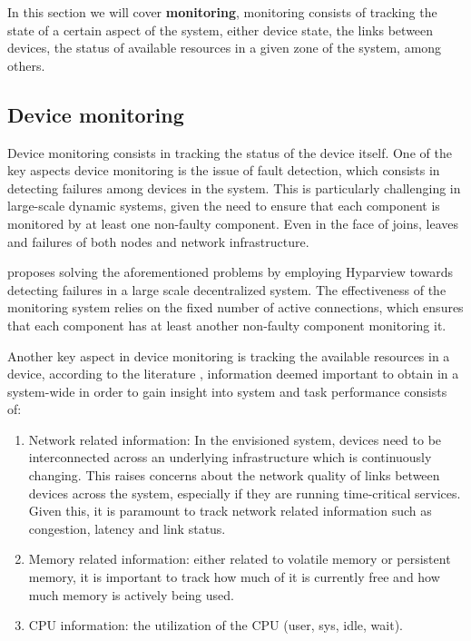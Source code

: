 
In this section we will cover \textbf{monitoring}, monitoring consists of tracking the state of a certain aspect of the system, either device state, the links between devices, the status of available resources in a given zone of the system, among others. 

\subsection{Device monitoring}

Device monitoring consists in tracking the status of the device itself. One of the key aspects device monitoring is the issue of fault detection, which consists in detecting failures among devices in the system. This is particularly challenging in large-scale dynamic systems, given the need to ensure that each component is monitored by at least one non-faulty component. Even in the face of joins, leaves and failures of both nodes and network infrastructure. 

\textcite{leitao2008large} proposes solving the aforementioned problems by employing Hyparview \cite{Hyparview} towards detecting failures in a large scale decentralized system. The effectiveness of the monitoring system relies on the fixed number of active connections, which ensures that each component has at least another non-faulty component monitoring it.

Another key aspect in device monitoring is tracking the available resources in a device, according to the literature \cite{7013000}, information deemed important to obtain in a system-wide in order to gain insight into system and task performance consists of:

\begin{enumerate}

    \item Network related information: In the envisioned system, devices need to be interconnected across an underlying infrastructure which is continuously changing. This raises concerns about the network quality of links between devices across the system, especially if they are running time-critical services. Given this, it is paramount to track network related information such as congestion, latency and link status.
    
    \item Memory related information: either related to volatile memory or persistent memory, it is important to track how  much of it is currently free and how much memory is actively being used.
    
    \item CPU information: the utilization of the CPU (user, sys, idle, wait).
    
\end{enumerate}

